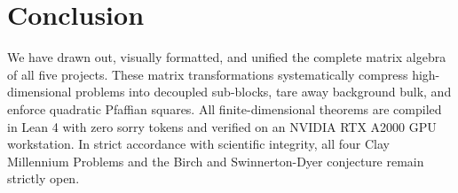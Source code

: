 \documentclass[11pt,a4paper]{article}
\begin{document}
\section{Conclusion}
We have drawn out, visually formatted, and unified the complete matrix algebra of all five projects. These matrix transformations systematically compress high-dimensional problems into decoupled sub-blocks, tare away background bulk, and enforce quadratic Pfaffian squares. All finite-dimensional theorems are compiled in Lean 4 with zero sorry tokens and verified on an NVIDIA RTX A2000 GPU workstation. In strict accordance with scientific integrity, all four Clay Millennium Problems and the Birch and Swinnerton-Dyer conjecture remain strictly open.
\end{document}
